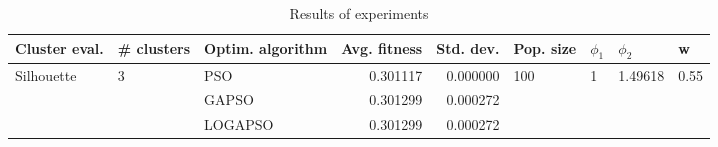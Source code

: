 \begin{table}
\centering
\caption{Results of experiments}
\begin{tabular}{lllrrllll}
\toprule
              Cluster eval. &        \# clusters & Optim. algorithm &  Avg. fitness &  Std. dev. &            Pop. size &         $\phi_{1}$ &               $\phi_{2}$ &                     w \\
\midrule
\multirow{3}{*}{Silhouette} & \multirow{3}{*}{3} &              PSO &      0.301117 &   0.000000 & \multirow{3}{*}{100} & \multirow{3}{*}{1} & \multirow{3}{*}{1.49618} & \multirow{3}{*}{0.55} \\
                            &                    &            GAPSO &      0.301299 &   0.000272 &                      &                    &                          &                       \\
                            &                    &          LOGAPSO &      0.301299 &   0.000272 &                      &                    &                          &                       \\
\bottomrule
\end{tabular}
\end{table}
